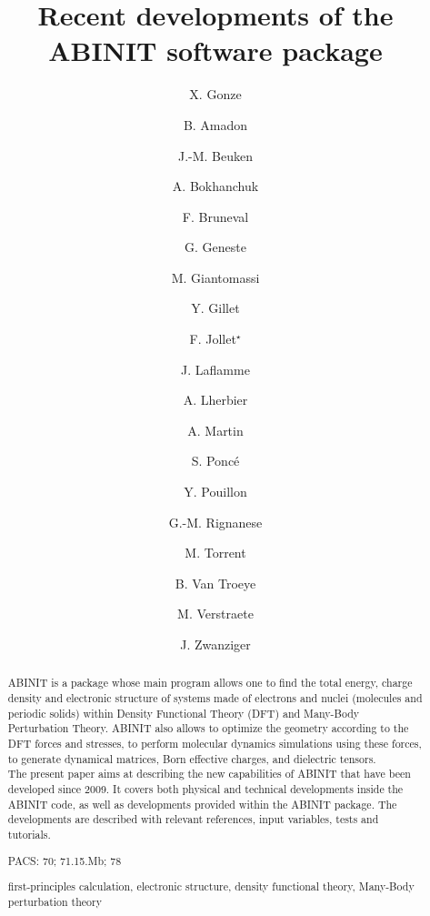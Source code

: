 \documentclass{elsart}
\begin{document}
\begin{frontmatter}

\title{Recent developments of the ABINIT software package}

\author[Louvain,ETSF]{X. Gonze}
\author[Bruyeres]{B. Amadon}
\author[Louvain,ETSF]{J.-M. Beuken}
\author[ThunderBay]{A. Bokhanchuk}
\author[Saclay]{F. Bruneval}
\author[Bruyeres]{G. Geneste}
\author[Louvain,ETSF]{M. Giantomassi}
\author[Louvain,ETSF]{Y. Gillet}
\author[Bruyeres]{F. Jollet$^{\star}$}
\author[Louvain,ETSF]{J. Laflamme}
\author[Louvain,ETSF]{A. Lherbier}
\author[Bruyeres]{A. Martin}
\author[Louvain,ETSF]{S. Ponc\'e}
\author[SanSebastian]{Y. Pouillon}
\author[Louvain,ETSF]{G.-M. Rignanese}
\author[Bruyeres]{M. Torrent}
\author[Louvain,ETSF]{B. Van Troeye}
\author[Liege]{M. Verstraete}
\author[Dalhousie]{J. Zwanziger}

\address[Louvain]{Universit\'e Catholique de Louvain, Louvain-la-Neuve (Belgium)}
\address[ETSF]{European Theoretical Spectroscopy Facility (ETSF)}
\address[Bruyeres]{CEA DAM-DIF, F-91297 Arpajon, France}
\address[Dalhousie]{Department of Chemistry and Institure for Research in Materials, Dalhousie University, Halifax, Canada}
\address[Liege]{Theoretical Physics of Materials, University of Li\`ege}
\address[Saclay]{CEA, DEN,Service de Recherches de M\'etallurgie Physique, F-91191 Gif-sur Yvette, France}
\address[SanSebastian]{Euskal Herriko Unibertsitatea \& Materials Evolution, Donostia-San Sebastian, Spain}
\address[ThunderBay]{Thunder Bay Regional Research Institute, 980 Oliver Road, Thunder Bay, Ontario, Canada P7B 6V4}


\begin{abstract}

ABINIT is a package whose main program allows one to find the total energy, charge density and electronic structure of systems made of electrons and nuclei (molecules and periodic solids) within Density Functional Theory (DFT) and Many-Body Perturbation Theory. ABINIT also allows to optimize the geometry according to the DFT forces and stresses, to perform molecular dynamics simulations using these forces, to generate dynamical matrices, Born effective charges, and dielectric tensors. \\
The present paper aims at describing the new capabilities of ABINIT that have been developed since 2009. It covers both physical and technical developments inside the ABINIT code, as well as developments provided within the ABINIT package. The developments are described with relevant references, input variables, tests and tutorials.

\begin{flushleft}
PACS: 70; 71.15.Mb; 78
\end{flushleft}

\begin{keyword}
first-principles calculation, electronic structure, density functional theory, Many-Body perturbation theory
\end{keyword}

\end{abstract}
\end{frontmatter}
\end{document}
